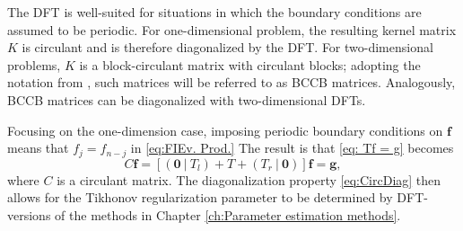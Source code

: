 \documentclass[12pt,notitlepage]{report}
\newcommand{\gVec}{\mathbf{g}}	%
\newcommand{\kMat}{K}	%
\newcommand{\fVec}{\mathbf{f}}	%
\begin{document}
The DFT is well-suited for situations in which the boundary conditions are assumed to be periodic. For one-dimensional problem, the resulting kernel matrix $\kMat$ is circulant and is therefore diagonalized by the DFT. For two-dimensional problems, $\kMat$ is a block-circulant matrix with circulant blocks; adopting the notation from \cite[p.~71-72]{Vogel:2002}, such matrices will be referred to as BCCB matrices. Analogously, BCCB matrices can be diagonalized with two-dimensional DFTs. \par 
Focusing on the one-dimension case, imposing periodic boundary conditions on $\fVec$ means that $f_j = f_{n-j}$ in \eqref{eq:FIEv. Prod.} The result is that \eqref{eq: Tf = g} becomes
\[ C\fVec = [(\bm{0} ~|~ T_l) + T + (T_r ~|~ \bm{0})]\fVec = \gVec,\]
where $C$ is a circulant matrix. The diagonalization property \eqref{eq:CircDiag} then allows for the Tikhonov regularization parameter to be determined by DFT-versions of the methods in Chapter \ref{ch:Parameter estimation methods}. 
\end{document}
